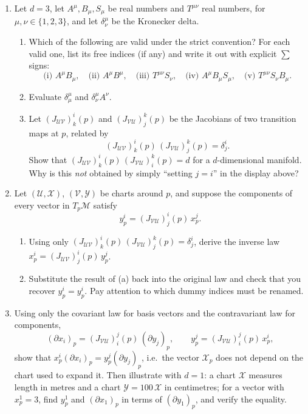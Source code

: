 \documentclass[11pt]{article}
\begin{document}
\begin{enumerate}[label=\textbf{4.\arabic*}, leftmargin=2.2cm, start=7]

\item \label{prob:index-bookkeeping}
Let $d=3$, let $A^\mu,B_\mu,S_\mu$ be real numbers and $T^{\mu\nu}$ real
numbers, for $\mu,\nu\in\{1,2,3\}$, and let $\delta^\mu_\nu$ be the
Kronecker delta.
\begin{enumerate}[label=(\alph*)]
  \item Which of the following are valid under the strict convention?
  For each valid one, list its free indices (if any) and write it out with
  explicit $\sum$ signs:
  \[
  \text{(i) } A^\mu B_\mu,\quad \text{(ii) } A^\mu B^\mu,\quad
  \text{(iii) } T^{\mu\nu}S_\nu,\quad \text{(iv) } A^\mu B_\mu S_\mu,\quad
  \text{(v) } T^{\mu\nu}S_\nu B_\mu.
  \]
  \item Evaluate $\delta^\mu_\mu$ and $\delta^\mu_\nu A^\nu$.
  \item Let $(J_{\mathcal{UV}})^i_k(p)$ and $(J_{\mathcal{VU}})^k_j(p)$ be
  the Jacobians of two transition maps at $p$, related by
  \[
  (J_{\mathcal{UV}})^i_k(p)\,(J_{\mathcal{VU}})^k_j(p)=\delta^i_j.
  \]
  Show that $(J_{\mathcal{UV}})^i_k(p)\,(J_{\mathcal{VU}})^k_i(p)=d$ for a
  $d$-dimensional manifold. Why is this \emph{not} obtained by simply
  ``setting $j=i$'' in the display above?
\end{enumerate}

\item \label{prob:invert-components}
Let $(\mathcal U,\mathcal X)$, $(\mathcal V,\mathcal Y)$ be charts around
$p$, and suppose the components of every vector in $T_p\mathcal M$ satisfy
\[
y^i_p=(J_{\mathcal{VU}})^i_j(p)\,x^j_p.
\]
\begin{enumerate}[label=(\alph*)]
  \item Using only $(J_{\mathcal{UV}})^i_k(p)\,(J_{\mathcal{VU}})^k_j(p)=
  \delta^i_j$, derive the inverse law $x^i_p=(J_{\mathcal{UV}})^i_j(p)\,
  y^j_p$.
  \item Substitute the result of (a) back into the original law and check
  that you recover $y^i_p=y^i_p$. Pay attention to which dummy indices must
  be renamed.
\end{enumerate}

\item \label{prob:expansion-invariant}
Using only the covariant law for basis vectors and the contravariant law
for components,
\[
(\partial x_i)_p=(J_{\mathcal{VU}})^j_i(p)\,(\partial y_j)_p,\qquad
y^j_p=(J_{\mathcal{VU}})^j_i(p)\,x^i_p,
\]
show that $x^i_p(\partial x_i)_p=y^j_p(\partial y_j)_p$, i.e.\ the vector
$\mathcal X_p$ does not depend on the chart used to expand it. Then
illustrate with $d=1$: a chart $\mathcal X$ measures length in metres and a
chart $\mathcal Y=100\,\mathcal X$ in centimetres; for a vector with
$x^1_p=3$, find $y^1_p$ and $(\partial x_1)_p$ in terms of $(\partial
y_1)_p$, and verify the equality.


\end{enumerate}
\end{document}

